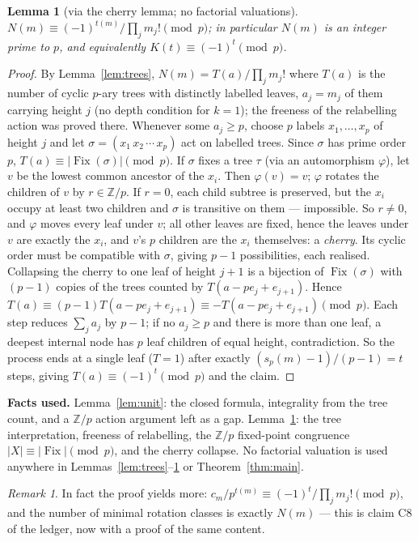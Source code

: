 \documentclass[11pt]{amsart}
\newtheorem{lemma}[theorem]{Lemma}
\theoremstyle{definition}
\theoremstyle{remark}
\newtheorem{remark}[theorem]{Remark}
\newcommand{\Z}{\mathbb Z}
\newcommand{\Nn}{N}
\newcommand{\sd}{s_p}
\newcommand{\Kc}{K}
\DeclareMathOperator{\Fix}{Fix}
\begin{document}
\begin{lemma}[via the cherry lemma; no factorial valuations]\label{lem:cherry}
$\Nn(m)\equiv(-1)^{t(m)}/\prod_jm_j!\pmod p$; in particular $\Nn(m)$ is an
integer prime to $p$, and equivalently $\Kc(t)\equiv(-1)^t\pmod p$.
\end{lemma}
\begin{proof}
By Lemma~\ref{lem:trees}, $\Nn(m)=T(a)/\prod_jm_j!$ where $T(a)$ is the
number of cyclic $p$-ary trees with distinctly labelled leaves, $a_j=m_j$ of
them carrying height $j$ (no depth condition for $k=1$); the freeness of the
relabelling action was proved there. Whenever some $a_j\ge p$, choose $p$
labels $x_1,\dots,x_p$ of height $j$ and let
$\sigma=(x_1\,x_2\,\cdots\,x_p)$ act on labelled trees. Since $\sigma$ has
prime order $p$, $T(a)\equiv|\Fix(\sigma)|\pmod p$. If $\sigma$ fixes a tree
$\tau$ (via an automorphism $\varphi$), let $v$ be the lowest common ancestor
of the $x_i$. Then $\varphi(v)=v$; $\varphi$ rotates the children of $v$ by
$r\in\Z/p$. If $r=0$, each child subtree is preserved, but the $x_i$ occupy
at least two children and $\sigma$ is transitive on them --- impossible. So
$r\ne0$, and $\varphi$ moves every leaf under $v$; all other leaves are fixed,
hence the leaves under $v$ are exactly the $x_i$, and $v$'s $p$ children are
the $x_i$ themselves: a \emph{cherry}. Its cyclic order must be compatible
with $\sigma$, giving $p-1$ possibilities, each realised. Collapsing the
cherry to one leaf of height $j+1$ is a bijection of $\Fix(\sigma)$ with
$(p-1)$ copies of the trees counted by $T(a-pe_j+e_{j+1})$. Hence
$T(a)\equiv(p-1)T(a-pe_j+e_{j+1})\equiv-T(a-pe_j+e_{j+1})\pmod p$.
Each step reduces $\sum_j a_j$ by $p-1$; if no $a_j\ge p$ and there is more
than one leaf, a deepest internal node has $p$ leaf children of equal height,
contradiction. So the process ends at a single leaf ($T=1$) after exactly
$(\sd(m)-1)/(p-1)=t$ steps, giving $T(a)\equiv(-1)^t\pmod p$ and the claim.
\end{proof}

\noindent\textbf{Facts used.} Lemma~\ref{lem:unit}: the closed formula,
integrality from the tree count, and a $\Z/p$ action argument left as a gap.
Lemma~\ref{lem:cherry}: the tree interpretation, freeness of relabelling, the
$\Z/p$ fixed-point congruence $|X|\equiv|\Fix|\pmod p$, and the cherry
collapse. No factorial valuation is used anywhere in
Lemmas~\ref{lem:trees}--\ref{lem:cherry} or Theorem~\ref{thm:main}.

\begin{remark}
In fact the proof yields more: $c_m/p^{t(m)}\equiv(-1)^t/\prod_jm_j!
\pmod p$, and the number of minimal rotation classes is exactly $\Nn(m)$ ---
this is claim C8 of the ledger, now with a proof of the same content.
\end{remark}
\end{document}
